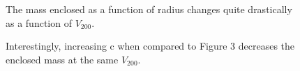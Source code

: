 \documentclass[twocolumn,11pt]{article}
\begin{document}
\begin{figure}[!h]
	\centering
	\noindent
      \caption{The mass enclosed as a function of radius changes quite drastically as a function of $V_{200}$.}
\end{figure}
\begin{figure}[!h]
	\centering
	\noindent
      \caption{Interestingly, increasing c when compared to Figure 3 decreases the enclosed mass at the same $V_{200}$.}
\end{figure}
\end{document}
